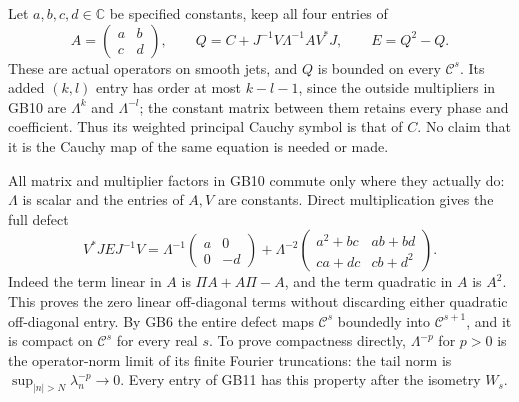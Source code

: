 \documentclass[
  11pt,
]{article}
\begin{document}
Let \(a,b,c,d\in\mathbb C\) be specified constants, keep all four
entries of \[
 A=\begin{pmatrix}a&b\\c&d\end{pmatrix},\qquad
 Q=C+J^{-1}V\Lambda^{-1}AV^*J,\qquad E=Q^2-Q.
 \tag{GB10}
\] These are actual operators on smooth jets, and \(Q\) is bounded on
every \(\mathcal C^s\). Its added \((k,l)\) entry has order at most
\(k-l-1\), since the outside multipliers in GB10 are \(\Lambda^k\) and
\(\Lambda^{-l}\); the constant matrix between them retains every phase
and coefficient. Thus its weighted principal Cauchy symbol is that of
\(C\). No claim that it is the Cauchy map of the same equation is needed
or made.

All matrix and multiplier factors in GB10 commute only where they
actually do: \(\Lambda\) is scalar and the entries of \(A,V\) are
constants. Direct multiplication gives the full defect \[
 V^*JEJ^{-1}V
 =\Lambda^{-1}\begin{pmatrix}a&0\\0&-d\end{pmatrix}
  +\Lambda^{-2}\begin{pmatrix}a^2+bc&ab+bd\\ca+dc&cb+d^2\end{pmatrix}.
 \tag{GB11}
\] Indeed the term linear in \(A\) is \(\Pi A+A\Pi-A\), and the term
quadratic in \(A\) is \(A^2\). This proves the zero linear off-diagonal
terms without discarding either quadratic off-diagonal entry. By GB6 the
entire defect maps \(\mathcal C^s\) boundedly into \(\mathcal C^{s+1}\),
and it is compact on \(\mathcal C^s\) for every real \(s\). To prove
compactness directly, \(\Lambda^{-p}\) for \(p>0\) is the operator-norm
limit of its finite Fourier truncations: the tail norm is
\(\sup_{|n|>N}\lambda_n^{-p}\to0\). Every entry of GB11 has this
property after the isometry \(W_s\).
\end{document}
